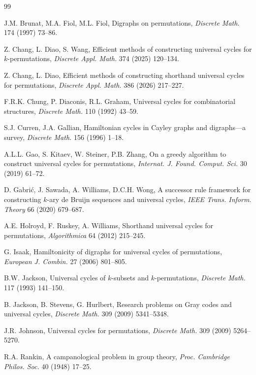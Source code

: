 \documentclass[4pt]{article} %
\begin{document}
\begin{thebibliography}{99}

J.M. Brunat, M.A. Fiol, M.L. Fiol,
Digraphs on permutations,
\emph{Discrete Math.} 174 (1997) 73--86.

Z. Chang, L. Diao, S. Wang,
Efficient methods of constructing universal cycles for $k$-permutations,
\emph{Discrete Appl. Math.} 374 (2025) 120--134.

Z. Chang, L. Diao,
Efficient methods of constructing shorthand universal cycles for permutations,
\emph{Discrete Appl. Math.} 386 (2026) 217--227.

F.R.K. Chung, P. Diaconis, R.L. Graham,
Universal cycles for combinatorial structures,
\emph{Discrete Math.} 110 (1992) 43--59.

S.J. Curren, J.A. Gallian,
Hamiltonian cycles in Cayley graphs and digraphs---a survey,
\emph{Discrete Math.} 156 (1996) 1--18.

A.L.L. Gao, S. Kitaev, W. Steiner, P.B. Zhang,
On a greedy algorithm to construct universal cycles for permutations,
\emph{Internat. J. Found. Comput. Sci.} 30 (2019) 61--72.

D. Gabri\'c, J. Sawada, A. Williams, D.C.H. Wong,
A successor rule framework for constructing $k$-ary de Bruijn sequences and
universal cycles,
\emph{IEEE Trans. Inform. Theory} 66 (2020) 679--687.

A.E. Holroyd, F. Ruskey, A. Williams,
Shorthand universal cycles for permutations,
\emph{Algorithmica} 64 (2012) 215--245.

G. Isaak,
Hamiltonicity of digraphs for universal cycles of permutations,
\emph{European J. Combin.} 27 (2006) 801--805.

B.W. Jackson,
Universal cycles of $k$-subsets and $k$-permutations,
\emph{Discrete Math.} 117 (1993) 141--150.

B. Jackson, B. Stevens, G. Hurlbert,
Research problems on Gray codes and universal cycles,
\emph{Discrete Math.} 309 (2009) 5341--5348.

J.R. Johnson,
Universal cycles for permutations,
\emph{Discrete Math.} 309 (2009) 5264--5270.

R.A. Rankin,
A campanological problem in group theory,
\emph{Proc. Cambridge Philos. Soc.} 40 (1948) 17--25.


\end{thebibliography}
\end{document}
